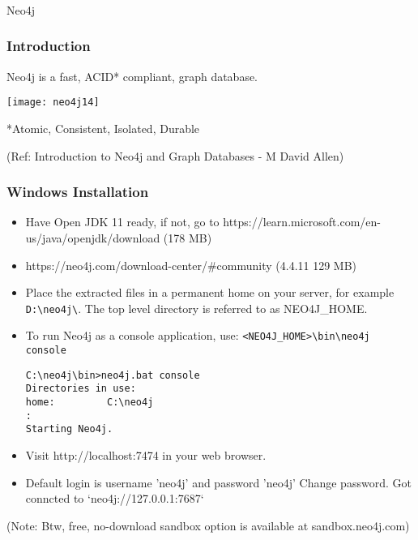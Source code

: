 \begin{frame}[fragile]\frametitle{}
\begin{center}
{\Large Neo4j}
\end{center}
\end{frame}


\begin{frame}[fragile]\frametitle{Introduction}
Neo4j is a fast, ACID* compliant, graph database.

\begin{center}
\texttt{[image: neo4j14]}
\end{center}	  

*Atomic, Consistent, Isolated, Durable

{\tiny (Ref: Introduction to Neo4j and Graph Databases
 - M David Allen)}

\end{frame}


\begin{frame}[fragile]\frametitle{Windows Installation}

\begin{itemize}
\item Have Open JDK 11 ready, if not, go to https://learn.microsoft.com/en-us/java/openjdk/download (178 MB)
\item https://neo4j.com/download-center/\#community (4.4.11 129 MB)
\item Place the extracted files in a permanent home on your server, for example \lstinline|D:\neo4j\|. The top level directory is referred to as NEO4J\_HOME.
\item To run Neo4j as a console application, use: \lstinline|<NEO4J_HOME>\bin\neo4j console|

\begin{lstlisting}
C:\neo4j\bin>neo4j.bat console
Directories in use:
home:         C:\neo4j
:
Starting Neo4j.
\end{lstlisting}

\item Visit http://localhost:7474 in your web browser.
\item Default login is username 'neo4j' and password 'neo4j' Change password. Got conncted to `neo4j://127.0.0.1:7687`
\end{itemize}

(Note: Btw, free, no-download sandbox option is available at sandbox.neo4j.com)
\end{frame}


